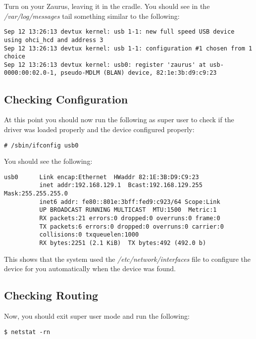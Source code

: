 \documentclass{article}
\begin{document}
Turn on your Zaurus, leaving it in the cradle. You should see in the
\emph{/var/log/messages} tail something similar to the following:

\begin{verbatim}
Sep 12 13:26:13 devtux kernel: usb 1-1: new full speed USB device using ohci_hcd and address 3
Sep 12 13:26:13 devtux kernel: usb 1-1: configuration #1 chosen from 1 choice
Sep 12 13:26:13 devtux kernel: usb0: register 'zaurus' at usb-0000:00:02.0-1, pseudo-MDLM (BLAN) device, 82:1e:3b:d9:c9:23
\end{verbatim}

\subsection{Checking Configuration}

At this point you should now run the following as super user to check if the
driver was loaded properly and the device configured properly:

\begin{verbatim}
# /sbin/ifconfig usb0
\end{verbatim}

You should see the following:

\begin{verbatim}
usb0      Link encap:Ethernet  HWaddr 82:1E:3B:D9:C9:23  
          inet addr:192.168.129.1  Bcast:192.168.129.255  Mask:255.255.255.0
          inet6 addr: fe80::801e:3bff:fed9:c923/64 Scope:Link
          UP BROADCAST RUNNING MULTICAST  MTU:1500  Metric:1
          RX packets:21 errors:0 dropped:0 overruns:0 frame:0
          TX packets:6 errors:0 dropped:0 overruns:0 carrier:0
          collisions:0 txqueuelen:1000 
          RX bytes:2251 (2.1 KiB)  TX bytes:492 (492.0 b)
\end{verbatim}

This shows that the system used the \emph{/etc/network/interfaces} file to
configure the device for you automatically when the device was found.

\subsection{Checking Routing}

Now, you should exit super user mode and run the following:

\begin{verbatim}
$ netstat -rn
\end{verbatim}
\end{document}
